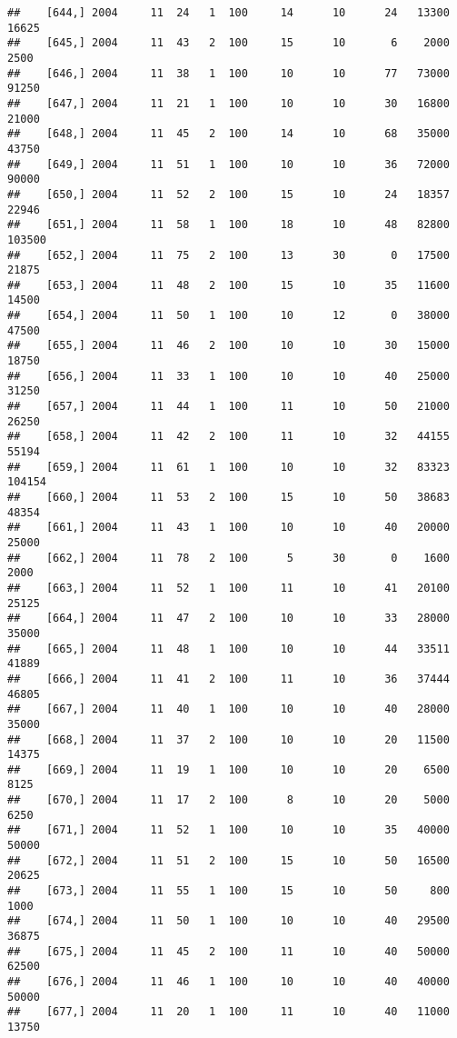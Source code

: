 \documentclass{article}\usepackage[]{graphicx}\usepackage[]{color}
\makeatletter
\newenvironment{kframe}{%
 \def\at@end@of@kframe{}%
 \ifinner\ifhmode%
  \def\at@end@of@kframe{\end{minipage}}%
  \begin{minipage}{\columnwidth}%
 \fi\fi%
 \def\FrameCommand##1{\hskip\@totalleftmargin \hskip-\fboxsep
 \colorbox{shadecolor}{##1}\hskip-\fboxsep
     \hskip-\linewidth \hskip-\@totalleftmargin \hskip\columnwidth}%
 \MakeFramed {\advance\hsize-\width
   \@totalleftmargin\z@ \linewidth\hsize
   \@setminipage}}%
 {\par\unskip\endMakeFramed%
 \at@end@of@kframe}
\newenvironment{knitrout}{}{} %
\makeatother
\begin{document}
\begin{knitrout}
\begin{kframe}
\begin{verbatim}
##    [644,] 2004     11  24   1  100     14      10      24   13300   16625
##    [645,] 2004     11  43   2  100     15      10       6    2000    2500
##    [646,] 2004     11  38   1  100     10      10      77   73000   91250
##    [647,] 2004     11  21   1  100     10      10      30   16800   21000
##    [648,] 2004     11  45   2  100     14      10      68   35000   43750
##    [649,] 2004     11  51   1  100     10      10      36   72000   90000
##    [650,] 2004     11  52   2  100     15      10      24   18357   22946
##    [651,] 2004     11  58   1  100     18      10      48   82800  103500
##    [652,] 2004     11  75   2  100     13      30       0   17500   21875
##    [653,] 2004     11  48   2  100     15      10      35   11600   14500
##    [654,] 2004     11  50   1  100     10      12       0   38000   47500
##    [655,] 2004     11  46   2  100     10      10      30   15000   18750
##    [656,] 2004     11  33   1  100     10      10      40   25000   31250
##    [657,] 2004     11  44   1  100     11      10      50   21000   26250
##    [658,] 2004     11  42   2  100     11      10      32   44155   55194
##    [659,] 2004     11  61   1  100     10      10      32   83323  104154
##    [660,] 2004     11  53   2  100     15      10      50   38683   48354
##    [661,] 2004     11  43   1  100     10      10      40   20000   25000
##    [662,] 2004     11  78   2  100      5      30       0    1600    2000
##    [663,] 2004     11  52   1  100     11      10      41   20100   25125
##    [664,] 2004     11  47   2  100     10      10      33   28000   35000
##    [665,] 2004     11  48   1  100     10      10      44   33511   41889
##    [666,] 2004     11  41   2  100     11      10      36   37444   46805
##    [667,] 2004     11  40   1  100     10      10      40   28000   35000
##    [668,] 2004     11  37   2  100     10      10      20   11500   14375
##    [669,] 2004     11  19   1  100     10      10      20    6500    8125
##    [670,] 2004     11  17   2  100      8      10      20    5000    6250
##    [671,] 2004     11  52   1  100     10      10      35   40000   50000
##    [672,] 2004     11  51   2  100     15      10      50   16500   20625
##    [673,] 2004     11  55   1  100     15      10      50     800    1000
##    [674,] 2004     11  50   1  100     10      10      40   29500   36875
##    [675,] 2004     11  45   2  100     11      10      40   50000   62500
##    [676,] 2004     11  46   1  100     10      10      40   40000   50000
##    [677,] 2004     11  20   1  100     11      10      40   11000   13750

\end{verbatim}
\end{kframe}
\end{knitrout}
\end{document}
